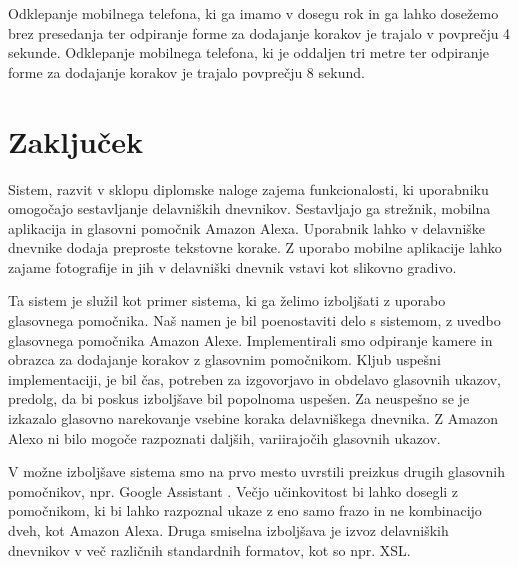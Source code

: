\documentclass[a4paper, 12pt]{book}
\begin{document}
Odklepanje mobilnega telefona, ki ga imamo v dosegu rok in ga lahko dosežemo brez presedanja ter odpiranje forme za dodajanje korakov je trajalo v povprečju 4 sekunde.
Odklepanje mobilnega telefona, ki je oddaljen tri metre ter odpiranje forme za dodajanje korakov je trajalo povprečju 8 sekund.







\chapter{Zaključek}

Sistem, razvit v sklopu diplomske naloge zajema funkcionalosti, ki uporabniku omogočajo sestavljanje delavniških dnevnikov.
Sestavljajo ga strežnik, mobilna aplikacija in glasovni pomočnik Amazon Alexa.
Uporabnik lahko v delavniške dnevnike dodaja preproste tekstovne korake.
Z uporabo mobilne aplikacije lahko zajame fotografije in jih v delavniški dnevnik vstavi kot slikovno gradivo.

Ta sistem je služil kot primer sistema, ki ga želimo izboljšati z uporabo glasovnega pomočnika.
Naš namen je bil poenostaviti delo s sistemom, z uvedbo glasovnega pomočnika Amazon Alexe.
Implementirali smo odpiranje kamere in obrazca za dodajanje korakov z glasovnim pomočnikom.
Kljub uspešni implementaciji, je bil čas, potreben za izgovorjavo in obdelavo glasovnih ukazov, predolg, da bi poskus izboljšave bil popolnoma uspešen.
Za neuspešno se je izkazalo glasovno narekovanje vsebine koraka delavniškega dnevnika.
Z Amazon Alexo ni bilo mogoče razpoznati daljših, variirajočih glasovnih ukazov.

V možne izboljšave sistema smo na prvo mesto uvrstili preizkus drugih glasovnih pomočnikov, npr. Google Assistant \cite{googleass}.
Večjo učinkovitost bi lahko dosegli z pomočnikom, ki bi lahko razpoznal ukaze z eno samo frazo in ne kombinacijo dveh, kot Amazon Alexa.
Druga smiselna izboljšava je izvoz delavniških dnevnikov v več različnih standardnih formatov, kot so npr. XSL.
\end{document}
